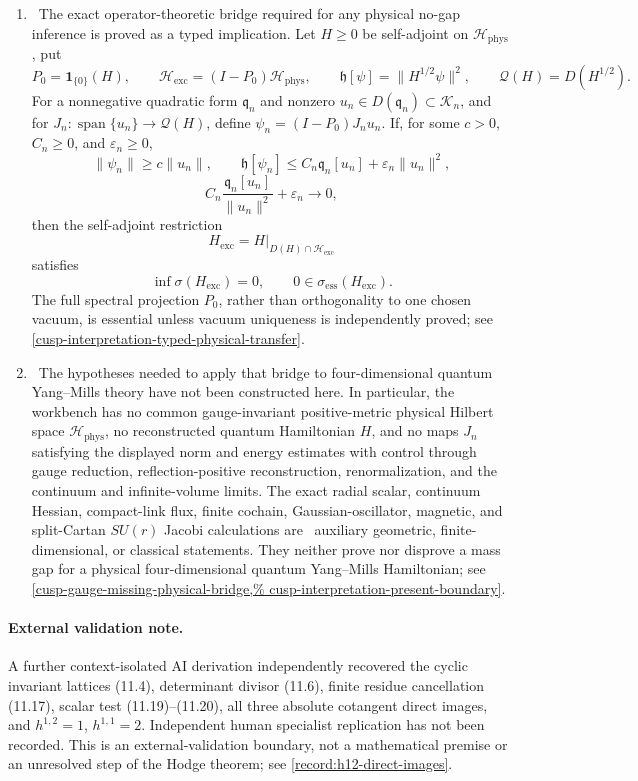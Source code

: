\begin{enumerate}[leftmargin=1.8em]
\item \Verified\ The exact operator-theoretic bridge required for any
physical no-gap inference is proved as a typed implication.  Let \(H\ge0\)
be self-adjoint on \(\mathcal H_{\mathrm{phys}}\), put
\[
 P_0=\mathbf1_{\{0\}}(H),\qquad
 \mathcal H_{\mathrm{exc}}=(I-P_0)\mathcal H_{\mathrm{phys}},\qquad
 \mathfrak h[\psi]=\lVert H^{1/2}\psi\rVert^2,\qquad
 \mathcal Q(H)=D(H^{1/2}).
\]
For a nonnegative quadratic form \(\mathfrak q_n\) and nonzero
\(u_n\in D(\mathfrak q_n)\subset\mathcal K_n\), and for
\(J_n:\operatorname{span}\{u_n\}\to\mathcal Q(H)\), define
\(\psi_n=(I-P_0)J_nu_n\).  If, for some \(c>0\),
\(C_n\ge0\), and \(\varepsilon_n\ge0\),
\[
 \lVert\psi_n\rVert\ge c\lVert u_n\rVert,\qquad
 \mathfrak h[\psi_n]\le C_n\mathfrak q_n[u_n]
 +\varepsilon_n\lVert u_n\rVert^2,
\]
\[
 C_n\frac{\mathfrak q_n[u_n]}{\lVert u_n\rVert^2}
 +\varepsilon_n\longrightarrow0,
\]
then the self-adjoint restriction
\[
 H_{\mathrm{exc}}
 =H\big|_{D(H)\cap\mathcal H_{\mathrm{exc}}}
\]
satisfies
\[
 \inf\sigma(H_{\mathrm{exc}})=0,\qquad
 0\in\sigma_{\mathrm{ess}}(H_{\mathrm{exc}}).
\]
The full spectral projection \(P_0\), rather than orthogonality to one
chosen vacuum, is essential unless vacuum uniqueness is independently
proved; see \cref{cusp-interpretation-typed-physical-transfer}.

\item \Open\ The hypotheses needed to apply that bridge to
four-dimensional quantum Yang--Mills theory have not been constructed here.
In particular, the workbench has no common gauge-invariant positive-metric
physical Hilbert space \(\mathcal H_{\mathrm{phys}}\), no reconstructed quantum
Hamiltonian \(H\), and no maps \(J_n\) satisfying the displayed norm and
energy estimates with control through gauge reduction, reflection-positive
reconstruction, renormalization, and the continuum and infinite-volume
 limits.  The exact radial scalar, continuum Hessian, compact-link flux,
 finite cochain, Gaussian-oscillator, magnetic, and split-Cartan
 \(SU(r)\) Jacobi calculations are
\Verified\ auxiliary geometric, finite-dimensional, or classical statements.
They neither prove nor disprove a mass gap for a
physical four-dimensional quantum Yang--Mills Hamiltonian; see
\cref{cusp-gauge-missing-physical-bridge,%
cusp-interpretation-present-boundary}.

\end{enumerate}

\paragraph{External validation note.}
A further context-isolated AI derivation independently recovered the cyclic
invariant lattices (11.4), determinant divisor (11.6), finite residue
cancellation (11.17), scalar test (11.19)--(11.20), all three absolute
cotangent direct images, and \(h^{1,2}=1\), \(h^{1,1}=2\).
Independent human specialist replication has not been recorded.  This is an
external-validation boundary, not a mathematical premise or an unresolved
step of the Hodge theorem; see \cref{record:h12-direct-images}.

